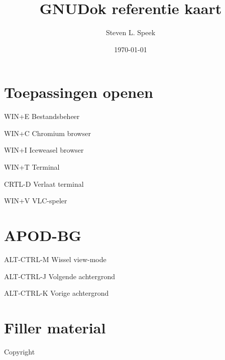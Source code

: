 \documentclass[10pt]{article}
\title{GNUDok referentie kaart}
\author{Steven L. Speek}
\date{\today{}}
\renewcommand{\maketitle}{%
{\begin{center}\Large \mythetitle\end{center}}
}
\begin{document}
\begin{multicols}{3}
	\maketitle

	\section{Toepassingen openen}
	\begin{ttdesc}[labelwidth=\widthof{\texttt{WIN+SHIFT+E}}]
	\item[WIN+E] Bestandsbeheer
	\item[WIN+C] Chromium browser
	\item[WIN+I] Iceweasel browser
	\item[WIN+T] Terminal
	\item[CRTL-D] Verlaat terminal
	\item[WIN+V] VLC-speler
	\end{ttdesc}
	\section{APOD-BG}
	\begin{ttdesc}[labelwidth=\widthof{\texttt{WIN+SHIFT+E}}]
	\item[ALT-CTRL-M] Wissel view-mode
	\item[ALT-CTRL-J] Volgende achtergrond
	\item[ALT-CTRL-K] Vorige achtergrond
	\end{ttdesc}

	\section{Filler material}

	\lipsum

	\noindent Copyright \textcopyright{} \thedate{} \theauthor{}

\end{multicols}
\end{document}
